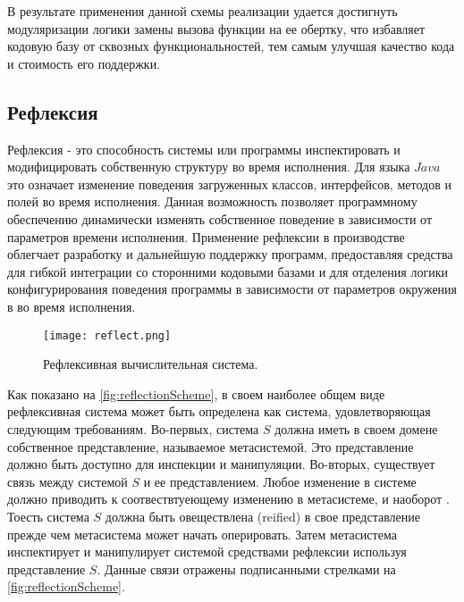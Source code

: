 В результате применения данной схемы реализации удается достигнуть модуляризации логики замены вызова функции на ее обертку, что избавляет кодовую базу от сквозных функциональностей, тем самым улучшая качество кода и стоимость его поддержки.

\subsection{Рефлексия}

Рефлексия - это способность системы или программы инспектировать и модифицировать собственную структуру во время исполнения. Для языка $Java$ это означает изменение поведения загруженных классов, интерфейсов, методов и полей во время исполнения. Данная возможность позволяет программному обеспечению динамически изменять собственное поведение в зависимости от параметров времени исполнения. Применение рефлексии в производстве облегчает разработку и дальнейшую поддержку программ, предоставляя средства для гибкой интеграции со сторонними кодовыми базами и для отделения логики конфигурирования поведения программы в зависимости от параметров окружения в во время исполнения.

\begin{figure}[h]
\centering
\texttt{[image: reflect.png]}
\caption{Рефлексивная вычислительная система.}
\label{fig:reflectionScheme}
\end{figure}

Как показано на \autoref{fig:reflectionScheme}, в своем наиболее общем виде рефлексивная система может быть определена как система, удовлетворяющая следующим требованиям. Во-первых, система $S$ должна иметь в своем домене собственное представление, называемое метасистемой. Это представление должно быть доступно для инспекции и манипуляции. Во-вторых, существует связь между системой $S$ и ее представлением. Любое изменение в системе должно приводить к соотвествтуеющему изменению в метасистеме, и наоборот \cite{javaReflection}. Тоесть система $S$ должна быть овеществлена (reified) в свое представление прежде чем метасистема может начать оперировать. Затем метасистема инспектирует и манипулирует системой средствами рефлексии используя представление $S$. Данные связи отражены подписанными стрелками на \autoref{fig:reflectionScheme}.


